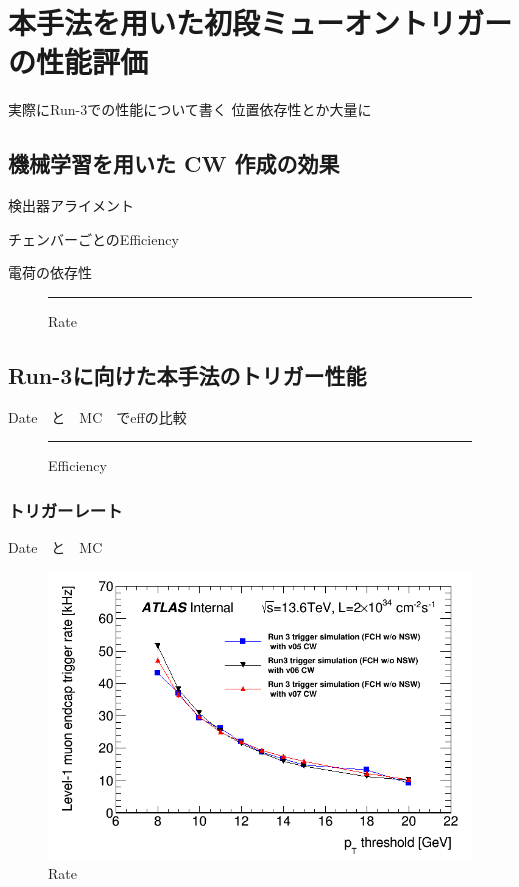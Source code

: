 \chapter{本手法を用いた初段ミューオントリガーの性能評価}
実際にRun-3での性能について書く
位置依存性とか大量に

\section{機械学習を用いた CW 作成の効果}
検出器アライメント

チェンバーごとのEfficiency

電荷の依存性
\begin{figure}[tb]
  \centering
  \rule{8cm}{6cm}
  \caption{Rate}
  \label{fig:fit_def}
\end{figure}


\section{Run-3に向けた本手法のトリガー性能}
Date　と　MC　でeffの比較
\begin{figure}[tb]
  \centering
  \rule{8cm}{6cm}
  \caption{Efficiency}
  \label{fig:fit_def}
\end{figure}

\subsection{トリガーレート}
Date　と　MC
\begin{figure}[tb]
  \centering
  \includegraphics[clip, width=14cm]{fig/5/l1mue_rate_run3.png}
  \caption{Rate}
  \label{fig:fit_def}
\end{figure}


